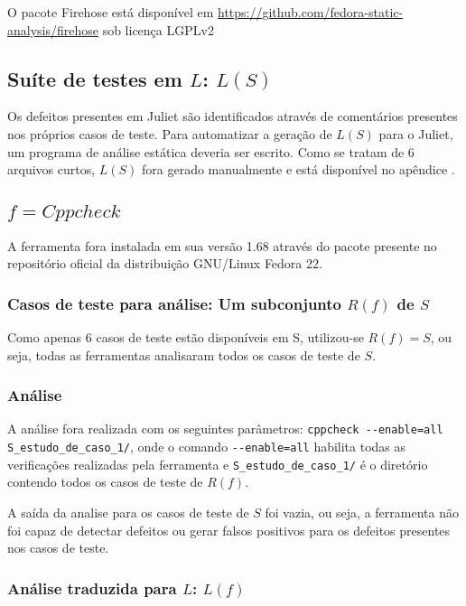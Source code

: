 O pacote Firehose está disponível em \url{https://github.com/fedora-static-analysis/firehose} sob licença LGPLv2

\subsection{Suíte de testes em $L$: $L(S)$}

Os defeitos presentes em Juliet são identificados através de comentários presentes nos próprios casos de teste. Para automatizar a geração de $L(S)$ para o Juliet, um programa de análise estática deveria ser escrito. Como se tratam de 6 arquivos curtos, $L(S)$ fora gerado manualmente e está disponível no apêndice .

\subsection{$f = Cppcheck$}

A ferramenta fora instalada em sua versão 1.68 através do pacote presente no repositório oficial da distribuição GNU/Linux Fedora 22.

\subsubsection{Casos de teste para análise: Um subconjunto $R(f)$ de $S$}

Como apenas 6 casos de teste estão disponíveis em S, utilizou-se $R(f) = S$, ou seja, todas as ferramentas analisaram todos os casos de teste de $S$.

\subsubsection{Análise}

A análise fora realizada com os seguintes parâmetros:
\lstinline{cppcheck --enable=all S_estudo_de_caso_1/},
onde o comando \lstinline{--enable=all} habilita todas as verificações realizadas pela ferramenta e \lstinline{S_estudo_de_caso_1/} é o diretório contendo todos os casos de teste de $R(f)$.

A saída da analise para os casos de teste de $S$ foi vazia, ou seja, a ferramenta não foi capaz de detectar defeitos ou gerar falsos positivos para os defeitos presentes nos casos de teste.

\subsubsection{Análise traduzida para $L$: $L(f)$}

